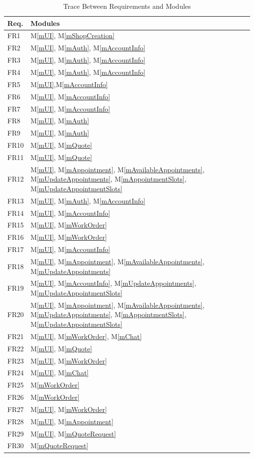 \documentclass[12pt, titlepage]{article}
\newcommand{\mref}[1]{M\ref{#1}}
\begin{document}
\begin{table}[H]
\centering
\begin{tabular}{p{} p{}}
\toprule
\textbf{Req.} & \textbf{Modules}\\
\midrule
FR1 & \mref{mUI}, \mref{mShopCreation}\\
FR2 & \mref{mUI}, \mref{mAuth}, \mref{mAccountInfo}\\
FR3 & \mref{mUI}, \mref{mAuth}, \mref{mAccountInfo}\\
FR4 & \mref{mUI}, \mref{mAuth}, \mref{mAccountInfo}\\
FR5 & \mref{mUI},\mref{mAccountInfo}\\
FR6 & \mref{mUI}, \mref{mAccountInfo}\\
FR7 & \mref{mUI}, \mref{mAccountInfo}\\
FR8 & \mref{mUI}, \mref{mAuth}\\
FR9 & \mref{mUI}, \mref{mAuth}\\
FR10 & \mref{mUI}, \mref{mQuote}\\
FR11 & \mref{mUI}, \mref{mQuote}\\
FR12 & \mref{mUI}, \mref{mAppointment}, \mref{mAvailableAppointments}, \mref{mUpdateAppointments}, \mref{mAppointmentSlots}, \mref{mUpdateAppointmentSlots}\\
FR13 & \mref{mUI}, \mref{mAuth}, \mref{mAccountInfo}\\
FR14 & \mref{mUI}, \mref{mAccountInfo}\\
FR15 & \mref{mUI}, \mref{mWorkOrder}\\
FR16 & \mref{mUI}, \mref{mWorkOrder}\\
FR17 & \mref{mUI}, \mref{mAccountInfo}\\
FR18 & \mref{mUI}, \mref{mAppointment}, \mref{mAvailableAppointments}, \mref{mUpdateAppointments}\\
FR19 & \mref{mUI}, \mref{mAccountInfo}, \mref{mUpdateAppointments}, \mref{mUpdateAppointmentSlots}\\
FR20 & \mref{mUI}, \mref{mAppointment}, \mref{mAvailableAppointments}, \mref{mUpdateAppointments}, \mref{mAppointmentSlots}, \mref{mUpdateAppointmentSlots}\\
FR21 & \mref{mUI}, \mref{mWorkOrder}, \mref{mChat}\\
FR22 & \mref{mUI}, \mref{mQuote}\\
FR23 & \mref{mUI}, \mref{mWorkOrder}\\
FR24 & \mref{mUI}, \mref{mChat}\\
FR25 & \mref{mWorkOrder}\\
FR26 & \mref{mWorkOrder}\\
FR27 & \mref{mUI}, \mref{mWorkOrder}\\
FR28 & \mref{mUI}, \mref{mAppointment}\\
FR29 & \mref{mUI}, \mref{mQuoteRequest}\\
FR30 & \mref{mQuoteRequest}\\
\bottomrule
\end{tabular}
\caption{Trace Between Requirements and Modules}
\label{TblRT}
\end{table}
\end{document}
